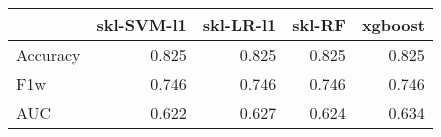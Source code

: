 \begin{tabular}{lrrrr}
\toprule
{} &  skl-SVM-l1 &  skl-LR-l1 &  skl-RF &  xgboost \\
\midrule
Accuracy &       0.825 &      0.825 &   0.825 &    0.825 \\
F1w      &       0.746 &      0.746 &   0.746 &    0.746 \\
AUC      &       0.622 &      0.627 &   0.624 &    0.634 \\
\bottomrule
\end{tabular}
